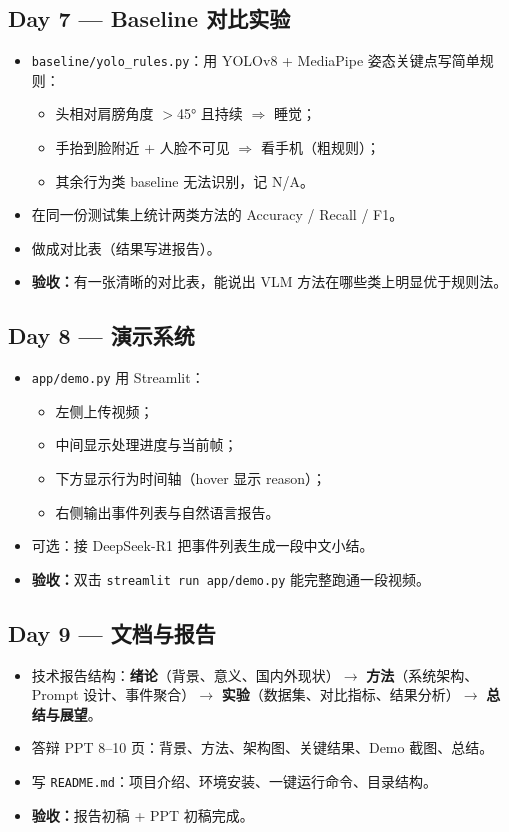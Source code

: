 \documentclass[12pt,a4paper]{ctexart}
\begin{document}
\subsection*{Day 7 — Baseline 对比实验}
\begin{itemize}
  \item \texttt{baseline/yolo\_rules.py}：用 YOLOv8 + MediaPipe 姿态关键点写简单规则：
  \begin{itemize}
    \item 头相对肩膀角度 $>$45° 且持续 $\Rightarrow$ 睡觉；
    \item 手抬到脸附近 + 人脸不可见 $\Rightarrow$ 看手机（粗规则）；
    \item 其余行为类 baseline 无法识别，记 N/A。
  \end{itemize}
  \item 在同一份测试集上统计两类方法的 Accuracy / Recall / F1。
  \item 做成对比表（结果写进报告）。
  \item \textbf{验收：}有一张清晰的对比表，能说出 VLM 方法在哪些类上明显优于规则法。
\end{itemize}

\subsection*{Day 8 — 演示系统}
\begin{itemize}
  \item \texttt{app/demo.py} 用 Streamlit：
  \begin{itemize}
    \item 左侧上传视频；
    \item 中间显示处理进度与当前帧；
    \item 下方显示行为时间轴（hover 显示 reason）；
    \item 右侧输出事件列表与自然语言报告。
  \end{itemize}
  \item 可选：接 DeepSeek-R1 把事件列表生成一段中文小结。
  \item \textbf{验收：}双击 \texttt{streamlit run app/demo.py} 能完整跑通一段视频。
\end{itemize}

\subsection*{Day 9 — 文档与报告}
\begin{itemize}
  \item 技术报告结构：\textbf{绪论}（背景、意义、国内外现状）$\rightarrow$
        \textbf{方法}（系统架构、Prompt 设计、事件聚合）$\rightarrow$
        \textbf{实验}（数据集、对比指标、结果分析）$\rightarrow$
        \textbf{总结与展望}。
  \item 答辩 PPT 8--10 页：背景、方法、架构图、关键结果、Demo 截图、总结。
  \item 写 \texttt{README.md}：项目介绍、环境安装、一键运行命令、目录结构。
  \item \textbf{验收：}报告初稿 + PPT 初稿完成。
\end{itemize}
\end{document}
